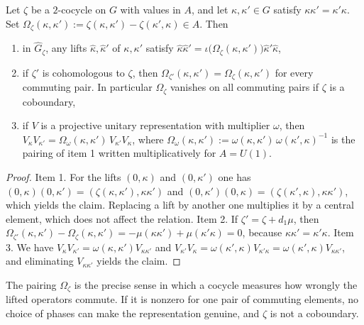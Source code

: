 \begin{proposition}\label{prop:commutator-pairing}
	Let $\zeta$ be a $2$-cocycle on $G$ with values in $A$, and let $\kappa,\kappa'\in G$ satisfy $\kappa\kappa'=\kappa'\kappa$. Set $\Omega_\zeta(\kappa,\kappa'):=\zeta(\kappa,\kappa')-\zeta(\kappa',\kappa)\in A$. Then
	\begin{enumerate}
		\item in $\widehat{G}_\zeta$, any lifts $\hat\kappa,\hat\kappa'$ of $\kappa,\kappa'$ satisfy $\hat\kappa\hat\kappa'=\iota\big(\Omega_\zeta(\kappa,\kappa')\big)\hat\kappa'\hat\kappa$,
		\item if $\zeta'$ is cohomologous to $\zeta$, then $\Omega_{\zeta'}(\kappa,\kappa')=\Omega_\zeta(\kappa,\kappa')$ for every commuting pair. In particular $\Omega_\zeta$ vanishes on all commuting pairs if $\zeta$ is a coboundary,
		\item if $V$ is a projective unitary representation with multiplier $\omega$, then $V_\kappa V_{\kappa'}=\Omega_\omega(\kappa,\kappa')\,V_{\kappa'}V_\kappa$, where $\Omega_\omega(\kappa,\kappa'):=\omega(\kappa,\kappa')\,\omega(\kappa',\kappa)^{-1}$ is the pairing of item 1 written multiplicatively for $A=U(1)$.
	\end{enumerate}
\end{proposition}

\begin{proof}
	Item 1. For the lifts $(0,\kappa)$ and $(0,\kappa')$ one has $(0,\kappa)(0,\kappa')=(\zeta(\kappa,\kappa'),\kappa\kappa')$ and $(0,\kappa')(0,\kappa)=(\zeta(\kappa',\kappa),\kappa\kappa')$, which yields the claim. Replacing a lift by another one multiplies it by a central element, which does not affect the relation. Item 2. If $\zeta'=\zeta+d_1\mu$, then $\Omega_{\zeta'}(\kappa,\kappa')-\Omega_\zeta(\kappa,\kappa')=-\mu(\kappa\kappa')+\mu(\kappa'\kappa)=0$, because $\kappa\kappa'=\kappa'\kappa$. Item 3. We have $V_\kappa V_{\kappa'}=\omega(\kappa,\kappa')V_{\kappa\kappa'}$ and $V_{\kappa'}V_\kappa=\omega(\kappa',\kappa)V_{\kappa'\kappa}=\omega(\kappa',\kappa)V_{\kappa\kappa'}$, and eliminating $V_{\kappa\kappa'}$ yields the claim.
\end{proof}

\noindent The pairing $\Omega_\zeta$ is the precise sense in which a cocycle measures how wrongly the lifted operators commute. If it is nonzero for one pair of commuting elements, no choice of phases can make the representation genuine, and $\zeta$ is not a coboundary.

